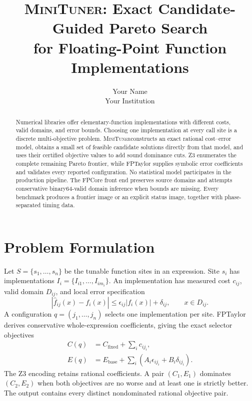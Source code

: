 \documentclass[10pt]{article}
\title{\textsc{MiniTuner}: Exact Candidate-Guided Pareto Search\\
for Floating-Point Function Implementations}
\author{Your Name\\Your Institution}
\date{}
\newcommand{\tool}{\textsc{MiniTuner}}
\begin{document}
\maketitle

\begin{abstract}
Numerical libraries offer elementary-function implementations with different
costs, valid domains, and error bounds. Choosing one implementation at every
call site is a discrete multi-objective problem. \tool constructs an exact
rational cost--error model, obtains a small set of feasible candidate solutions
directly from that model, and uses their certified objective values to add sound
dominance cuts. Z3 enumerates the complete remaining Pareto frontier, while
FPTaylor supplies symbolic error coefficients and validates every reported
configuration. No statistical model participates in the
production pipeline. The FPCore front end preserves source domains and attempts
conservative binary64-valid domain inference when bounds are missing. Every
benchmark produces a frontier image or an explicit status image, together with
phase-separated timing data.
\end{abstract}

\section{Problem Formulation}

Let $S=\{s_1,\ldots,s_n\}$ be the tunable function sites in an expression.
Site $s_i$ has implementations $I_i=\{I_{i1},\ldots,I_{im_i}\}$. An
implementation has measured cost $c_{ij}$, valid domain $D_{ij}$, and local
error specification
\begin{equation}
 |\widehat f_{ij}(x)-f_i(x)| \leq
 \epsilon_{ij}|f_i(x)|+\delta_{ij},\qquad x\in D_{ij}.
\end{equation}
A configuration $q=(j_1,\ldots,j_n)$ selects one implementation per site.
FPTaylor derives conservative whole-expression coefficients, giving the exact
selector objectives
\begin{align}
 C(q)&=C_{\mathrm{fixed}}+\sum_i c_{ij_i},\\
 E(q)&=E_{\mathrm{base}}+
 \sum_i(A_i\epsilon_{ij_i}+B_i\delta_{ij_i}).
\end{align}
The Z3 encoding retains rational coefficients. A pair $(C_1,E_1)$ dominates
$(C_2,E_2)$ when both objectives are no worse and at least one is strictly
better. The output contains every distinct nondominated rational objective
pair.
\end{document}

